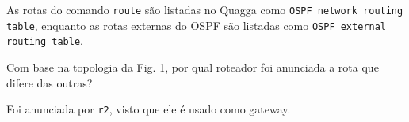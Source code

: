 \documentclass{article}
\begin{document}
As rotas do comando \texttt{route} são listadas no Quagga como
\texttt{OSPF network routing table}, enquanto as rotas externas
do OSPF são listadas como \texttt{OSPF external routing table}.

\begin{tcolorbox}
    Com base na topologia da Fig. 1, por qual roteador foi
    anunciada a rota que difere das outras?
\end{tcolorbox}

Foi anunciada por \texttt{r2}, visto que ele é usado como gateway.
\end{document}
